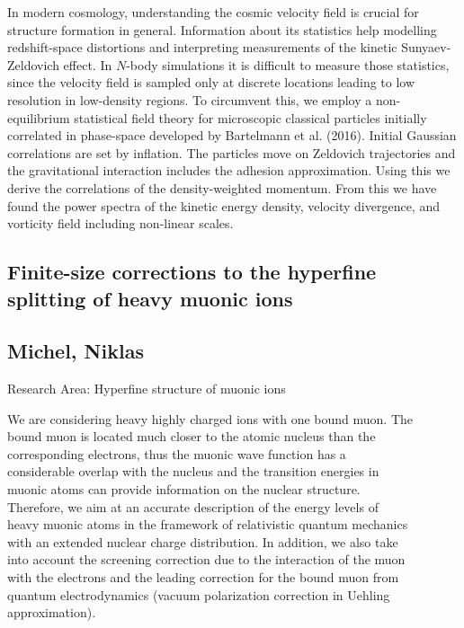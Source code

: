 \noindent In modern cosmology, understanding the cosmic velocity field is crucial for structure formation in general. Information about its statistics help modelling redshift-space distortions and interpreting measurements of the kinetic Sunyaev-Zeldovich effect. In $N$-body simulations it is difficult to measure those statistics, since the velocity field is sampled only at discrete locations leading to low resolution in low-density regions.\newline 
To circumvent this, we employ a non-equilibrium statistical field theory for microscopic classical particles initially correlated in phase-space developed by Bartelmann et al. (2016). Initial Gaussian correlations are set by inflation. The particles move on Zeldovich trajectories and the gravitational interaction includes the adhesion approximation.\newline
Using this we derive the correlations of the density-weighted momentum. From this we have found the power spectra of the kinetic energy density, velocity divergence, and vorticity field including non-linear scales.

\subsection*{\centering \large Finite-size corrections to the hyperfine splitting of heavy muonic ions}
\subsection*{\centering \normalsize Michel, Niklas}
Research Area: Hyperfine structure of muonic ions\newline

\noindent We are considering heavy highly charged ions with one bound muon. The\\bound muon is located much closer to the atomic nucleus than the\\corresponding electrons, thus the muonic wave function has a\\considerable overlap with the nucleus and the transition energies in\\muonic atoms can provide information on the nuclear structure.\\Therefore, we aim at an accurate description of the energy levels of\\heavy muonic atoms in the framework of relativistic quantum mechanics\\with an extended nuclear charge distribution. In addition, we also take\\into account the screening correction due to the interaction of the muon\\with the electrons and the leading correction for the bound muon from\\quantum electrodynamics (vacuum polarization correction in Uehling\\approximation).
\newpage
